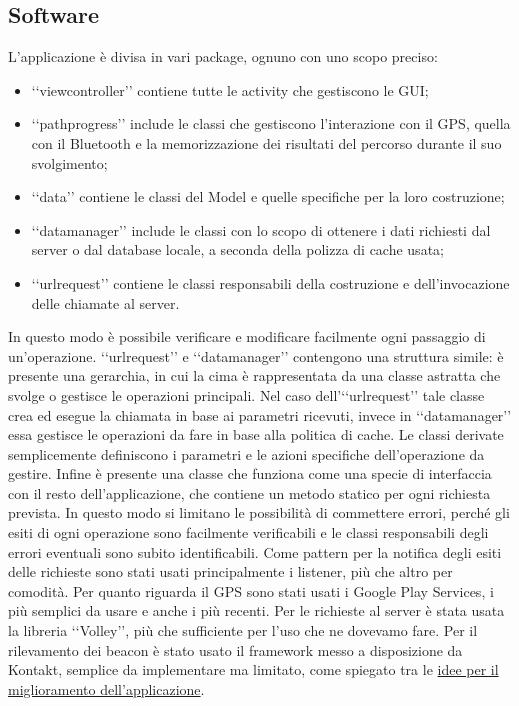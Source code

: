 	\subsection{Software}
		L'applicazione è divisa in vari package, ognuno con uno scopo preciso:
		\begin{itemize}
			\item ‘‘viewcontroller’’ contiene tutte le activity che gestiscono le GUI;
			\item ‘‘pathprogress’’ include le classi che gestiscono l'interazione con il GPS, quella con il Bluetooth e la memorizzazione dei risultati del percorso durante il suo svolgimento;
			\item ‘‘data’’ contiene le classi del Model e quelle specifiche per la loro costruzione;
			\item ‘‘datamanager’’ include le classi con lo scopo di ottenere i dati richiesti dal server o dal database locale, a seconda della polizza di cache usata;
			\item ‘‘urlrequest’’ contiene le classi responsabili della costruzione e dell'invocazione delle chiamate al server.
		\end{itemize}
		In questo modo è possibile verificare e modificare facilmente ogni passaggio di un'operazione.
		‘‘urlrequest’’ e ‘‘datamanager’’ contengono una struttura simile: è presente una gerarchia, in cui la cima è rappresentata da una classe astratta che svolge o gestisce le operazioni principali. Nel caso dell'‘‘urlrequest’’ tale classe crea ed esegue la chiamata in base ai parametri ricevuti, invece in ‘‘datamanager’’ essa gestisce le operazioni da fare in base alla politica di cache. Le classi derivate semplicemente definiscono i parametri e le azioni specifiche dell'operazione da gestire. Infine è presente una classe che funziona come una specie di interfaccia con il resto dell'applicazione, che contiene un metodo statico per ogni richiesta prevista. In questo modo si limitano le possibilità di commettere errori, perché gli esiti di ogni operazione sono facilmente verificabili e le classi responsabili degli errori eventuali sono subito identificabili.
		Come pattern per la notifica degli esiti delle richieste sono stati usati principalmente i listener, più che altro per comodità.
		Per quanto riguarda il GPS sono stati usati i Google Play Services, i più semplici da usare e anche i più recenti. Per le richieste al server è stata usata la libreria ‘‘Volley’’, più che sufficiente per l'uso che ne dovevamo fare. Per il rilevamento dei beacon è stato usato il framework messo a disposizione da Kontakt, semplice da implementare ma limitato, come spiegato tra le \hyperref[sec:libreria_beacon]{idee per il miglioramento dell'applicazione}.
